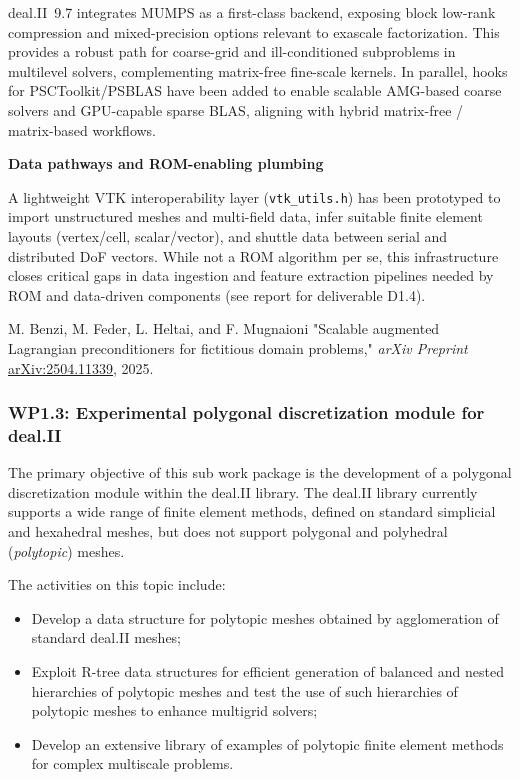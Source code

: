 \documentclass[a4paper,12pt, numbers]{article}
\begin{document}
deal.II~9.7 integrates MUMPS as a first-class backend, exposing block low-rank
compression and mixed-precision options relevant to exascale factorization.
This provides a robust path for coarse-grid and ill-conditioned subproblems in
multilevel solvers, complementing matrix-free fine-scale kernels. In parallel,
hooks for PSCToolkit/PSBLAS have been added to enable scalable AMG-based
coarse solvers and GPU-capable sparse BLAS, aligning with hybrid matrix-free /
matrix-based workflows.

\noindent\textbf{Data pathways and ROM-enabling plumbing}

A lightweight VTK interoperability layer (\texttt{vtk\_utils.h}) has been
prototyped to import unstructured meshes and multi-field data, infer suitable
finite element layouts (vertex/cell, scalar/vector), and shuttle data between
serial and distributed DoF vectors. While not a ROM algorithm per se, this
infrastructure closes critical gaps in data ingestion and feature extraction
pipelines needed by ROM and data-driven components (see report for deliverable
D1.4).

\begin{thebibliography}{10}
 M. Benzi, M. Feder, L. Heltai, and F. Mugnaioni "Scalable augmented Lagrangian preconditioners for fictitious domain problems," \emph{arXiv Preprint} \href{https://arxiv.org/abs/2504.11339}{arXiv:2504.11339}, 2025.
\end{thebibliography}

\subsubsection*{WP1.3: Experimental polygonal discretization module for deal.II} %
The primary objective of this sub work package is the development of a polygonal
discretization module within the deal.II library. The deal.II library currently
supports a wide range of finite element methods, defined on standard simplicial
and hexahedral meshes, but does not support polygonal and polyhedral (\emph{polytopic}) meshes.

The activities on this topic include:
\begin{itemize}
\item Develop a data structure for polytopic meshes obtained by agglomeration of standard deal.II meshes;
\item Exploit  R-tree data structures for efficient generation of balanced and nested hierarchies of  polytopic meshes and test the use of such hierarchies of  polytopic meshes to enhance multigrid solvers;
\item Develop an extensive library of examples of polytopic finite element methods for complex multiscale problems.  
\end{itemize}
\end{document}
